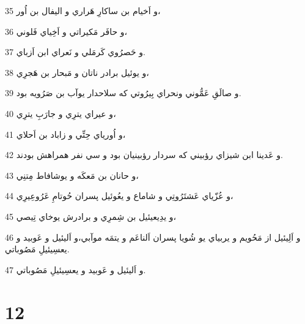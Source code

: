 \par 35 و اَخيام بن ساکارِ هَراري و اليفال بن اُور،
\par 36 و حافَر مَکيراتي و اَخِياي فَلوني،
\par 37 و حَصرُوي کَرمَلي و نَعراي ابن اَزباي.
\par 38 و يوئيل برادر ناتان و مَبحار بن هَجرِي،
\par 39 و صالَقِ عَمُّوني ونحراي بِيرُوتي که سلاحدار يوآب بن صَرُويه بود.
\par 40 و عيراي يترِي و جارَبِ يترِي،
\par 41 و اُورياي حِتِّي و زاباد بن اَحلاي،
\par 42 و عَدينا ابن شيزاي رؤبيني که سردار رؤبينيان بود و سي نفر همراهش بودند.
\par 43 و حانان بن مَعکَه و يوشافاط مِتنِي،
\par 44 و عُزّياي عَشتَرُوتِي و شاماع و يعُوئيل پسران حُوتامِ عَرُوعِيرِي،
\par 45 و يدِيعيئيل بن شِمرِي و برادرش يوخاي تِيصي،
\par 46 و اَلِيئيل از مَحُويم و يربياي يو شُويا پسران اَلناعَم و يتمَه موآبي،و اَليئيل و عَوبيد و يعسِيئيلِ مَصُوباتي.
\par 47 و اَليئيل و عَوبيد و يعسِيئيلِ مَصُوباتي.
 
\chapter{12}

